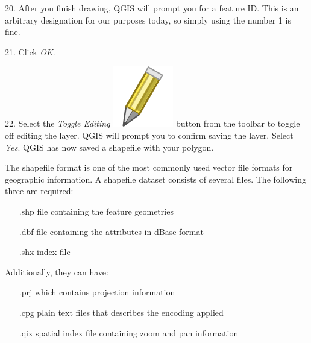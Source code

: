 \documentclass[oneside,a4paper,11pt,explicit]{book}
\begin{document}
	
	20. After you finish drawing, QGIS will prompt you for a feature ID. This is an arbitrary designation for our purposes today, so simply using the number 1 is fine. 
	
	21. Click \textit{OK}. 
	
	22. Select the \textit{Toggle Editing} \includegraphics[height=\fontcharht\font`\B]{mActionToggleEditing.png} button from the toolbar to toggle off editing the layer. QGIS will prompt you to confirm saving the layer. Select \textit{Yes}. QGIS has now saved a shapefile with your polygon. 
	
	\begin{tcolorbox}[colback=yellow!5!white,colframe=IceCreamLeaf,title=\textbf{What Are Shapefiles?}]
		The shapefile format is one of the most commonly used vector file formats for geographic information. A shapefile dataset consists of several files. The following three are required:
			
		\begin{itemize}
			\centering
			\item[\color{orange} .shp] file containing the feature geometries
			\item[\color{orange} .dbf] file containing the attributes in \href{https://en.wikipedia.org/wiki/.dbf}{dBase} format
			\item[\color{orange} .shx] index file
		\end{itemize}
			
		Additionally, they can have: 
			
		\begin{itemize}
			\centering
			\item[\color{orange} .prj] which contains projection information
			\item[\color{orange} .cpg] plain text files that describes the encoding applied
			\item[\color{orange} .qix] spatial index file containing zoom and pan information
		\end{itemize}			
	\end{tcolorbox}
	
\end{document}

